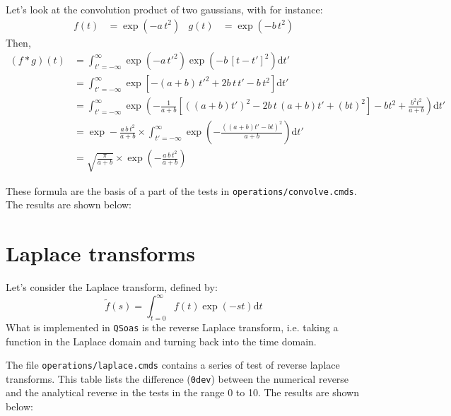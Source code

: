 \documentclass{article}
\newcommand{\dd}{\mathrm{d}}
\newcommand{\pa}[1]{\left(#1\right)}
\newcommand{\pab}[1]{\left[#1\right]}
\newcommand{\QSoas}{\texttt{QSoas}}
\begin{document}
Let's look at the convolution product of two gaussians, with for
instance:
%
\begin{align}
  f(t) &= \exp \pa{-a\,t^2} &
  g(t) &= \exp \pa{-b\,t^2}
\end{align}
%
Then,
\begin{align}
  (f\mathop{*}g)(t) &=
  \int_{t' = -\infty}^{\infty}
  \exp \pa{-a\,t'^2}\exp \pa{-b\,[t-t']^2} \dd t'\\[3mm]
  &= 
  \int_{t' = -\infty}^{\infty}
  \exp \pab{-\pa{a+b}\,t'^2 + 2b\,t\,t' - b\,t^2} \dd t'\\[3mm]
  &= 
  \int_{t' = -\infty}^{\infty}
  \exp
  \pa{-\frac{1}{a+b}
    \pab{\pa{(a+b)t'}^2 - 2b\,t\,\pa{a+b}t' + \pa{b t}^2}
    - bt^2 + \frac{b^2t^2}{a+b}
  } \dd t'\\[3mm]
  &=
  \exp -\frac{a\,b\,t^2}{a+b} \times
  \int_{t' = -\infty}^{\infty}
  \exp
  \pa{-\frac{\pa{(a+b)t' - bt}^2}{a+b}}
  \dd t'\\[3mm]
  &= \sqrt{\frac{\pi}{a+b}} \times 
  \exp \pa{-\frac{a\,b\,t^2}{a+b}}
\end{align}

These formula are the basis of a part of the tests in
\texttt{operations/convolve.cmds}. The results are shown below:

\begin{testresult}
  \begin{center}
  \end{center}
  \caption{Results of the tests of convolving two gaussians in
    \texttt{operations/convolve.cmds}}
\end{testresult}


\section{Laplace transforms}

Let's consider the Laplace transform, defined by:
%
\begin{equation}
  \tilde{f}(s) = \int_{t = 0}^{\infty} f(t) \exp \pa{-st} \dd t
  \label{eq:laplace:def}
\end{equation}
%
What is implemented in \QSoas{} is the reverse Laplace transform,
i.e. taking a function in the Laplace domain and turning back into the
time domain.

The file \texttt{operations/laplace.cmds} contains a series of test of
reverse laplace transforms. This table lists the difference
(\texttt{0dev}) between the numerical reverse and the analytical
reverse in the tests in the range 0 to 10. The results are shown
below:
\end{document}
